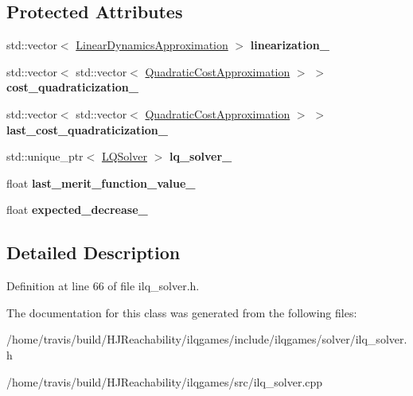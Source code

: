 \subsection*{Protected Attributes}
\begin{DoxyCompactItemize}
\item 
std\+::vector$<$ \hyperlink{structilqgames_1_1_linear_dynamics_approximation}{Linear\+Dynamics\+Approximation} $>$ {\bfseries linearization\+\_\+}\hypertarget{classilqgames_1_1_i_l_q_solver_a8b02b9f196152504e2b4f746704f99a7}{}\label{classilqgames_1_1_i_l_q_solver_a8b02b9f196152504e2b4f746704f99a7}

\item 
std\+::vector$<$ std\+::vector$<$ \hyperlink{structilqgames_1_1_quadratic_cost_approximation}{Quadratic\+Cost\+Approximation} $>$ $>$ {\bfseries cost\+\_\+quadraticization\+\_\+}\hypertarget{classilqgames_1_1_i_l_q_solver_af45202b8baa2630b5a3c47c6bf853005}{}\label{classilqgames_1_1_i_l_q_solver_af45202b8baa2630b5a3c47c6bf853005}

\item 
std\+::vector$<$ std\+::vector$<$ \hyperlink{structilqgames_1_1_quadratic_cost_approximation}{Quadratic\+Cost\+Approximation} $>$ $>$ {\bfseries last\+\_\+cost\+\_\+quadraticization\+\_\+}\hypertarget{classilqgames_1_1_i_l_q_solver_ad23a3a3fc170e9b966c9232b9c9de971}{}\label{classilqgames_1_1_i_l_q_solver_ad23a3a3fc170e9b966c9232b9c9de971}

\item 
std\+::unique\+\_\+ptr$<$ \hyperlink{classilqgames_1_1_l_q_solver}{L\+Q\+Solver} $>$ {\bfseries lq\+\_\+solver\+\_\+}\hypertarget{classilqgames_1_1_i_l_q_solver_afb4b2fed2450e965d347dd6a38a33bb6}{}\label{classilqgames_1_1_i_l_q_solver_afb4b2fed2450e965d347dd6a38a33bb6}

\item 
float {\bfseries last\+\_\+merit\+\_\+function\+\_\+value\+\_\+}\hypertarget{classilqgames_1_1_i_l_q_solver_a41e4e2648d28a5b2000f6fb24336a7f9}{}\label{classilqgames_1_1_i_l_q_solver_a41e4e2648d28a5b2000f6fb24336a7f9}

\item 
float {\bfseries expected\+\_\+decrease\+\_\+}\hypertarget{classilqgames_1_1_i_l_q_solver_a8911cc96f54b18573199db7ab4e2d86c}{}\label{classilqgames_1_1_i_l_q_solver_a8911cc96f54b18573199db7ab4e2d86c}

\end{DoxyCompactItemize}


\subsection{Detailed Description}


Definition at line 66 of file ilq\+\_\+solver.\+h.



The documentation for this class was generated from the following files\+:\begin{DoxyCompactItemize}
\item 
/home/travis/build/\+H\+J\+Reachability/ilqgames/include/ilqgames/solver/ilq\+\_\+solver.\+h\item 
/home/travis/build/\+H\+J\+Reachability/ilqgames/src/ilq\+\_\+solver.\+cpp\end{DoxyCompactItemize}
